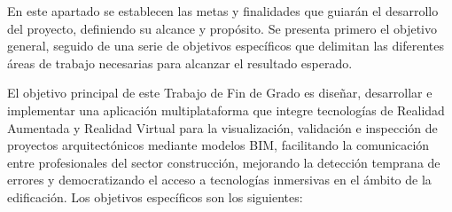 En este apartado se establecen las metas y finalidades que guiarán el desarrollo del proyecto, definiendo su alcance y propósito. Se presenta primero el objetivo general, seguido de una serie de objetivos específicos que delimitan las diferentes áreas de trabajo necesarias para alcanzar el resultado esperado.

El objetivo principal de este Trabajo de Fin de Grado es diseñar, desarrollar e implementar una aplicación multiplataforma que integre tecnologías de Realidad Aumentada y Realidad Virtual para la visualización, validación e inspección de proyectos arquitectónicos mediante modelos BIM, facilitando la comunicación entre profesionales del sector construcción, mejorando la detección temprana de errores y democratizando el acceso a tecnologías inmersivas en el ámbito de la edificación. Los objetivos específicos son los siguientes:

